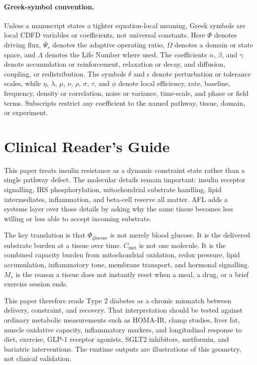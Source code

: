 \documentclass[11pt]{article}
\begin{document}
\paragraph{Greek-symbol convention.}
Unless a manuscript states a tighter equation-local meaning, Greek symbols are local CDFD variables or coefficients, not universal constants. Here $\Phi$ denotes driving flux, $\Psi_s$ denotes the adaptive operating ratio, $\Omega$ denotes a domain or state space, and $\Lambda$ denotes the Life Number where used. The coefficients $\alpha$, $\beta$, and $\gamma$ denote accumulation or reinforcement, relaxation or decay, and diffusion, coupling, or redistribution. The symbols $\delta$ and $\epsilon$ denote perturbation or tolerance scales, while $\eta$, $\lambda$, $\mu$, $\nu$, $\rho$, $\sigma$, $\tau$, and $\phi$ denote local efficiency, rate, baseline, frequency, density or correlation, noise or variance, time-scale, and phase or field terms. Subscripts restrict any coefficient to the named pathway, tissue, domain, or experiment.

\section*{Clinical Reader's Guide}
This paper treats insulin resistance as a dynamic constraint state rather than a single pathway defect. The molecular details remain important: insulin receptor signalling, IRS phosphorylation, mitochondrial substrate handling, lipid intermediates, inflammation, and beta-cell reserve all matter. AFL adds a systems layer over those details by asking why the same tissue becomes less willing or less able to accept incoming substrate.

The key translation is that $\Phi_{\mathrm{glucose}}$ is not merely blood glucose. It is the delivered substrate burden at a tissue over time. $C_{\mathrm{met}}$ is not one molecule. It is the combined capacity burden from mitochondrial oxidation, redox pressure, lipid accumulation, inflammatory tone, membrane transport, and hormonal signalling. $M_s$ is the reason a tissue does not instantly reset when a meal, a drug, or a brief exercise session ends.

This paper therefore reads Type 2 diabetes as a chronic mismatch between delivery, constraint, and recovery. That interpretation should be tested against ordinary metabolic measurements such as HOMA-IR, clamp studies, liver fat, muscle oxidative capacity, inflammatory markers, and longitudinal response to diet, exercise, GLP-1 receptor agonists, SGLT2 inhibitors, metformin, and bariatric interventions. The runtime outputs are illustrations of this geometry, not clinical validation.
\end{document}
